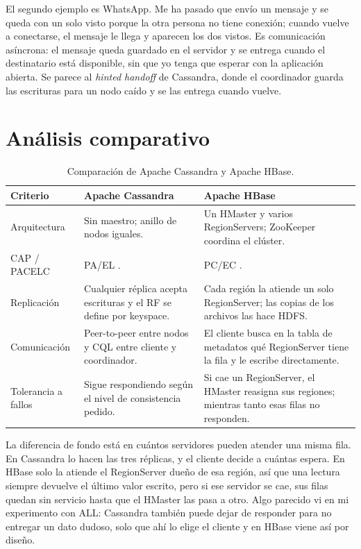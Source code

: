 \documentclass[12pt,a4paper]{article}
\begin{document}
El segundo ejemplo es WhatsApp. Me ha pasado que envío un mensaje y se queda con un solo visto porque la otra persona no tiene conexión; cuando vuelve a conectarse, el mensaje le llega y aparecen los dos vistos. Es comunicación asíncrona: el mensaje queda guardado en el servidor y se entrega cuando el destinatario está disponible, sin que yo tenga que esperar con la aplicación abierta. Se parece al \textit{hinted handoff} de Cassandra, donde el coordinador guarda las escrituras para un nodo caído y se las entrega cuando vuelve.

\section{Análisis comparativo}


\begin{table}[H]
  \centering
  \caption{Comparación de Apache Cassandra y Apache HBase.}
  \label{tab:comparacion}
  \begin{tabularx}{\textwidth}{lXX}
    \toprule
    Criterio & Apache Cassandra & Apache HBase \\
    \midrule
    Arquitectura & Sin maestro; anillo de nodos iguales. & Un HMaster y varios RegionServers; ZooKeeper coordina el clúster. \\
    CAP / PACELC & PA/EL \cite[p.~172]{ahmed2023consistency}. & PC/EC \cite[p.~172]{ahmed2023consistency}. \\
    Replicación & Cualquier réplica acepta escrituras y el RF se define por keyspace. & Cada región la atiende un solo RegionServer; las copias de los archivos las hace HDFS. \\
    Comunicación & Peer-to-peer entre nodos y CQL entre cliente y coordinador. & El cliente busca en la tabla de metadatos qué RegionServer tiene la fila y le escribe directamente. \\
    Tolerancia a fallos & Sigue respondiendo según el nivel de consistencia pedido. & Si cae un RegionServer, el HMaster reasigna sus regiones; mientras tanto esas filas no responden. \\
    \bottomrule
  \end{tabularx}
\end{table}

La diferencia de fondo está en cuántos servidores pueden atender una misma fila. En Cassandra lo hacen las tres réplicas, y el cliente decide a cuántas espera. En HBase solo la atiende el RegionServer dueño de esa región, así que una lectura siempre devuelve el último valor escrito, pero si ese servidor se cae, sus filas quedan sin servicio hasta que el HMaster las pasa a otro. Algo parecido vi en mi experimento con ALL: Cassandra también puede dejar de responder para no entregar un dato dudoso, solo que ahí lo elige el cliente y en HBase viene así por diseño.
\end{document}
